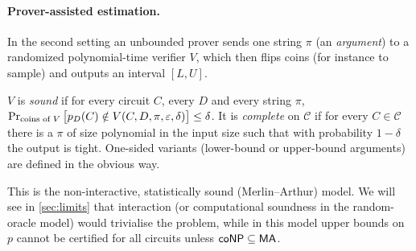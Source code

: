 \paragraph{Prover-assisted estimation.}
In the second setting an unbounded prover sends one string $\pi$ (an
\emph{argument}) to a randomized polynomial-time verifier $V$, which then
flips coins (for instance to sample) and outputs an interval $[L,U]$.

\begin{definition}\label{def:argument}
$V$ is \emph{sound} if for every circuit $C$, every $D$ and every string
$\pi$, $\Pr_{\text{coins of }V}\big[p_D(C)\notin V(C,D,\pi,\varepsilon,\delta)\big]\le\delta$.
It is \emph{complete} on $\mathcal C$ if for every $C\in\mathcal C$ there is a
$\pi$ of size polynomial in the input size such that with probability $1-\delta$
the output is tight. One-sided variants (lower-bound or upper-bound arguments) are defined
in the obvious way.
\end{definition}

This is the non-interactive, statistically sound (Merlin--Arthur) model. We
will see in \cref{sec:limits} that interaction (or computational soundness in the
random-oracle model) would trivialise the problem, while in this model upper bounds on $p$ cannot be
certified for all circuits unless $\mathsf{coNP}\subseteq\mathsf{MA}$.

